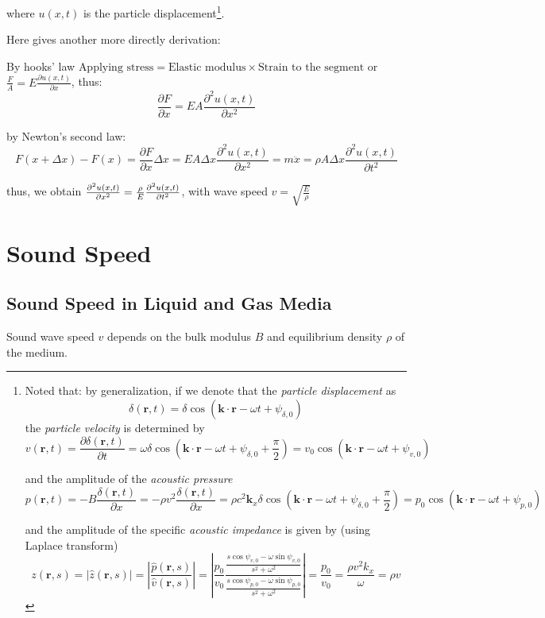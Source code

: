 \documentclass[openany]{book}
\begin{document}
where $u(x,t)$ is the particle displacement\footnote{Noted that: by generalization, if we denote that the \emph{particle displacement} as \[\delta (\mathbf{r},t)=\delta \cos \left(\mathbf{k}\cdot \mathbf{r}-\omega t+\psi _{\delta ,0}\right)\]
the \emph{particle velocity} is determined by
\[v(\mathbf{r},t)=\frac{\partial \delta (\mathbf{r},t)}{\partial t}=\omega \delta \cos \left(\mathbf{k}\cdot \mathbf{r}-\omega t+\psi _{\delta ,0}+\frac{\pi }{2}\right)=v_0\cos \left(\mathbf{k}\cdot \mathbf{r}-\omega t+\psi _{v,0}\right)\] 

and the amplitude of the \emph{acoustic pressure}
\[p(\mathbf{r},t)=-B\frac{\delta (\mathbf{r},t)}{\partial x}=-\rho v^2\frac{\delta (\mathbf{r},t)}{\partial x}=\rho c^2\mathbf{k}_x\delta \cos \left(\mathbf{k}\cdot \mathbf{r}-\omega t+\psi _{\delta ,0}+\frac{\pi }{2}\right)=p_0\cos \left(\mathbf{k}\cdot \mathbf{r}-\omega t+\psi _{p,0}\right)\]

and the amplitude of the specific \emph{acoustic impedance} is given by (using Laplace transform)
\[z(\mathbf{r},s)=\left|\hat{z}(\mathbf{r},s)\right|=\left|\frac{\hat{p}(\mathbf{r},s)}{\hat{v}(\mathbf{r},s)}\right|=\left|\frac{p_0}{v_0}\frac{\frac{s\cos \psi _{v,0}-\omega \sin \psi _{v,0}}{s^2+\omega ^2}}{\frac{s\cos \psi _{p,0}-\omega \sin \psi _{p,0}}{s^2+\omega ^2}}\right|=\frac{p_0}{v_0}=\frac{\rho v^2k_x}{\omega }=\rho v\]}.

Here gives another more directly derivation:

By hooks' law $\text{Applying stress}= \text{Elastic modulus} \times \text{Strain to the segment}$ or $\frac{F}{A}=E\frac{\partial u(x,t)}{\partial x}$, thus:
\[\frac{\partial F}{\partial x}=EA\frac{\partial ^2u(x,t)}{\partial x^2}\]

by Newton's second law: 
\[F(x+\Delta x)-F(x)=\frac{\partial F}{\partial x}\Delta x=EA\Delta x\frac{\partial ^2u(x,t)}{\partial x^2}=m\ddot{x}=\rho A\Delta x\frac{\partial ^2u(x,t)}{\partial t^2}\]

thus, we obtain ${\partial^2 u(x,t) \over \partial x^2 }={ \rho\over E}{\partial^2 u(x,t) \over \partial t^2}$, with wave speed $v=\sqrt{\frac{E}{\rho}}$
\section{Sound Speed}
\subsection{Sound Speed in Liquid and Gas Media}
Sound wave speed $v$ depends on the bulk modulus $B$ and equilibrium density $\rho $ of the medium.
\end{document}
